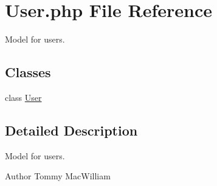 \hypertarget{User_8php}{
\section{\-User.php \-File \-Reference}
\label{User_8php}
}


\-Model for users.  


\subsection*{\-Classes}
\begin{DoxyCompactItemize}
\item 
class \hyperlink{classUser}{\-User}
\end{DoxyCompactItemize}


\subsection{\-Detailed \-Description}
\-Model for users. \begin{DoxyAuthor}{\-Author}
\-Tommy \-Mac\-William 
\end{DoxyAuthor}
